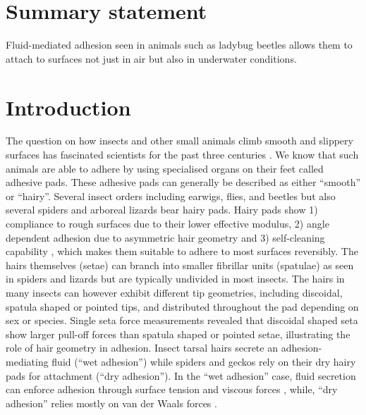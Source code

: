 \documentclass[vruler,JEB]{COB}%
\begin{document}

\section{Summary statement}

Fluid-mediated adhesion seen in animals such as ladybug beetles allows them to attach to surfaces not just in air but also in underwater conditions.

\section{Introduction}

The question on how insects and other small animals climb smooth and slippery
surfaces has fascinated scientists for the past three centuries \citep{RN198,RN59}. We know that such animals are able to adhere by using specialised organs on their feet called adhesive pads. These adhesive pads can generally be described as either ``smooth'' or ``hairy''. Several insect orders including earwigs, flies, and beetles \citep{Gorb:2001b} but also several spiders \citep{Coddington:1991} and arboreal lizards \citep{Williams:1982} bear hairy pads. Hairy pads show 1) compliance to rough surfaces due to their lower effective modulus, 2) angle dependent adhesion due to asymmetric hair geometry and 3) self-cleaning capability \citep{RN20}, which makes them suitable to adhere to most surfaces reversibly. The hairs themselves (setae) can branch into smaller fibrillar units (spatulae) as seen in spiders and lizards but are typically undivided in most insects. The hairs in many insects can however exhibit different tip geometries, including discoidal, spatula shaped or pointed tips, and distributed throughout the pad depending on sex or species\citep{RN19}. Single seta force measurements revealed that discoidal shaped seta show larger pull-off forces than spatula shaped or pointed setae\citep{RN79}, illustrating the role of hair geometry in adhesion. Insect tarsal hairs secrete an adhesion-mediating fluid (``wet adhesion'') while spiders and geckos rely on their dry hairy pads for attachment (``dry adhesion''). In the ``wet adhesion'' case, fluid secretion can enforce adhesion through surface tension and viscous forces \citep{RN201,RN155,RN71}, while, ``dry adhesion'' relies mostly on van der Waals forces \citep{RN202}. 
\end{document}
